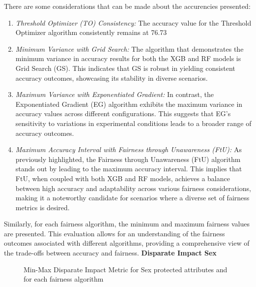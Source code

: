 There are some considerations that can be made about the accurencies presented:
\begin{enumerate}
    \item \emph{Threshold Optimizer (TO) Consistency:} The accuracy value for the Threshold Optimizer algorithm consistently remains at 76.73%

    \item \emph{Minimum Variance with Grid Search:} The algorithm that demonstrates the minimum variance in accuracy results for both the XGB and RF models is Grid Search (GS). This indicates that GS is robust in yielding consistent accuracy outcomes, showcasing its stability in diverse scenarios.

    \item \emph{Maximum Variance with Exponentiated Gradient:} In contrast, the Exponentiated Gradient (EG) algorithm exhibits the maximum variance in accuracy values across different configurations. This suggests that EG's sensitivity to variations in experimental conditions leads to a broader range of accuracy outcomes.

    \item \emph{Maximum Accuracy Interval with Fairness through Unawareness (FtU):} As previously highlighted, the Fairness through Unawareness (FtU) algorithm stands out by leading to the maximum accuracy interval. This implies that FtU, when coupled with both XGB and RF models, achieves a balance between high accuracy and adaptability across various fairness considerations, making it a noteworthy candidate for scenarios where a diverse set of fairness metrics is desired.
\end{enumerate}

Similarly, for each fairness algorithm, the minimum and maximum fairness values are presented. This evaluation allows for an understanding of the fairness outcomes associated with different algorithms, providing a comprehensive view of the trade-offs between accuracy and fairness.
\newpage
\textbf{Disparate Impact Sex}
\begin{figure}[H]
    \centering
    \caption{Min-Max Disparate Impact Metric for Sex protected attributes and for each fairness algorithm}
\end{figure}

